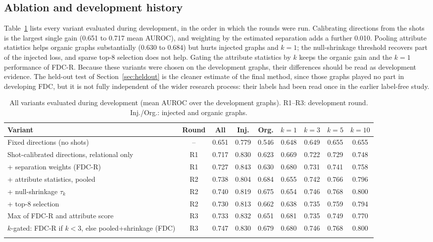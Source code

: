 \documentclass[pdflatex,sn-mathphys-ay]{sn-jnl}
\theoremstyle{plain}
\theoremstyle{remark}
\begin{document}
\subsection{Ablation and development history}\label{sec:ablation}

Table~\ref{tab:ablation} lists every variant evaluated during development, in the order in which the rounds were run. Calibrating directions from the shots is the largest single gain (0.651 to 0.717 mean AUROC), and weighting by the estimated separation adds a further 0.010. Pooling attribute statistics helps organic graphs substantially (0.630 to 0.684) but hurts injected graphs and $k=1$; the null-shrinkage threshold recovers part of the injected loss, and sparse top-8 selection does not help. Gating the attribute statistics by $k$ keeps the organic gain and the $k=1$ performance of FDC-R. Because these variants were chosen on the development graphs, their differences should be read as development evidence. The held-out test of Section~\ref{sec:heldout} is the cleaner estimate of the final method, since those graphs played no part in developing FDC, but it is not fully independent of the wider research process: their labels had been read once in the earlier label-free study.

\begin{table}[!ht]
\caption{All variants evaluated during development (mean AUROC over the development graphs). R1--R3: development round. Inj./Org.: injected and organic graphs.}
\label{tab:ablation}
\scriptsize
\setlength{\tabcolsep}{2.2pt}
\begin{tabular*}{\textwidth}{@{\extracolsep{\fill}}p{4.6cm}cccccccc@{}}
\toprule
Variant & Round & All & Inj. & Org. & $k{=}1$ & $k{=}3$ & $k{=}5$ & $k{=}10$ \\
\midrule
Fixed directions (no shots) & -- & 0.651 & 0.779 & 0.546 & 0.648 & 0.649 & 0.655 & 0.655 \\
Shot-calibrated directions, relational only & R1 & 0.717 & 0.830 & 0.623 & 0.669 & 0.722 & 0.729 & 0.748 \\
+ separation weights (FDC-R) & R1 & 0.727 & 0.843 & 0.630 & 0.680 & 0.731 & 0.741 & 0.758 \\
+ attribute statistics, pooled & R2 & 0.738 & 0.804 & 0.684 & 0.655 & 0.742 & 0.766 & 0.796 \\
+ null-shrinkage $\tau_k$ & R2 & 0.740 & 0.819 & 0.675 & 0.654 & 0.746 & 0.768 & 0.800 \\
+ top-8 selection & R2 & 0.730 & 0.813 & 0.662 & 0.638 & 0.735 & 0.759 & 0.794 \\
Max of FDC-R and attribute score & R3 & 0.733 & 0.832 & 0.651 & 0.681 & 0.735 & 0.749 & 0.770 \\
$k$-gated: FDC-R if $k<3$, else pooled+shrinkage (FDC) & R3 & 0.747 & 0.830 & 0.679 & 0.680 & 0.746 & 0.768 & 0.800 \\
\botrule
\end{tabular*}
\end{table}
\end{document}
